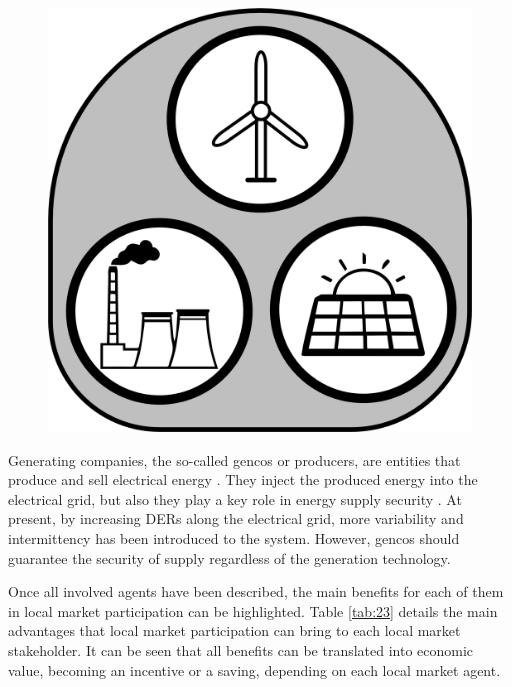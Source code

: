 \begin{figure}
	\centering
	\includegraphics[width=0.1\columnwidth ]{ChapterIntro/Figures/Gencos.jpg}
	\label{gencos}  
\end{figure}


Generating companies, the so-called gencos or producers, are entities that produce and sell electrical energy \cite{Kirschen2004}. They inject the produced energy into the electrical grid, but also they play a key role in energy supply security \cite{USEFFoundation2015a}. At present, by increasing DERs along the electrical grid, more variability and intermittency has been introduced to the system. However, gencos should guarantee the security of supply regardless of the generation technology.

Once all involved agents have been described, the main benefits for each of them in local market participation can be highlighted.
Table \ref{tab:23} details the main advantages that local market participation can bring to each local market stakeholder. It can be seen that all benefits can be translated into economic value, becoming an incentive or a saving, depending on each local market agent.

\begin{table}[htbp]
\centering
\caption{Local market stakeholders and main benefit of their interaction}
\label{tab:23}
\end{table}


